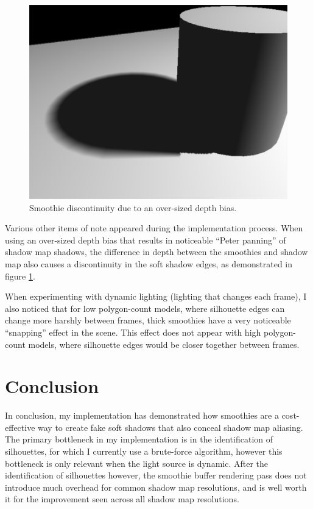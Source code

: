 \documentclass[sigconf]{acmart}
\begin{document}
\begin{figure}[ht]
    \includegraphics[width=\linewidth]{reportfiles/smoothie-discontinuity-due-to-bias}
    \caption{Smoothie discontinuity due to an over-sized depth bias.}
    \label{fig:smoothie-discontinuity}
\end{figure}

Various other items of note appeared during the implementation process. When using an over-sized depth bias that results in noticeable ``Peter panning'' of shadow map shadows, the difference in depth between the smoothies and shadow map also causes a discontinuity in the soft shadow edges, as demonstrated in figure \ref{fig:smoothie-discontinuity}. 

When experimenting with dynamic lighting (lighting that changes each frame), I also noticed that for low polygon-count models, where silhouette edges can change more harshly between frames, thick smoothies have a very noticeable ``snapping'' effect in the scene. This effect does not appear with high polygon-count models, where silhouette edges would be closer together between frames.

\section{Conclusion}

In conclusion, my implementation has demonstrated how smoothies are a cost-effective way to create fake soft shadows that also conceal shadow map aliasing. The primary bottleneck in my implementation is in the identification of silhouettes, for which I currently use a brute-force algorithm, however this bottleneck is only relevant when the light source is dynamic. After the identification of silhouettes however, the smoothie buffer rendering pass does not introduce much overhead for common shadow map resolutions, and is well worth it for the improvement seen across all shadow map resolutions.
    


\end{document}
